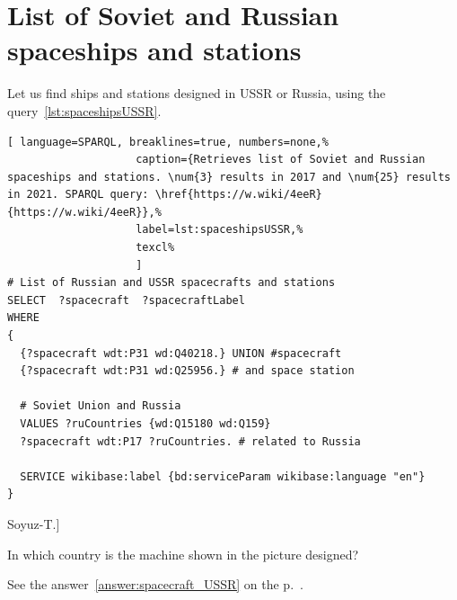 \section{List of Soviet and Russian spaceships and stations}

Let us find ships and stations designed in USSR or Russia, using the query~\ref{lst:spaceshipsUSSR}.

\begin{lstlisting}[ language=SPARQL, breaklines=true, numbers=none,%
                    caption={Retrieves list of Soviet and Russian spaceships and stations. \num{3} results in 2017 and \num{25} results in 2021. SPARQL query: \href{https://w.wiki/4eeR}{https://w.wiki/4eeR}},%
                    label=lst:spaceshipsUSSR,%
                    texcl%
                    ]
# List of Russian and USSR spacecrafts and stations
SELECT  ?spacecraft  ?spacecraftLabel 
WHERE
{
  {?spacecraft wdt:P31 wd:Q40218.} UNION #spacecraft
  {?spacecraft wdt:P31 wd:Q25956.} # and space station
  
  # Soviet Union and Russia
  VALUES ?ruCountries {wd:Q15180 wd:Q159}
  ?spacecraft wdt:P17 ?ruCountries. # related to Russia
  
  SERVICE wikibase:label {bd:serviceParam wikibase:language "en"}
}
\end{lstlisting}%

\begin{marginfigure}
{
	\setlength{\fboxsep}{0pt}%
	\setlength{\fboxrule}{1pt}%
}
\caption
[Soyuz-T.]{%
In which country is the machine shown in the picture designed?

See the answer~\ref{answer:spacecraft_USSR} on the p.~\pageref{answer:spacecraft_USSR}.
}
\label{question:spacecraft_soyuzT}
\end{marginfigure}


